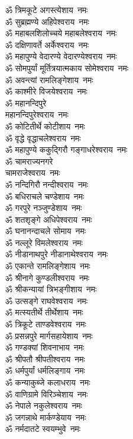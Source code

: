 \begin{multicols}{2}
\begin{flushleft}
ॐ त्रिमकूटे अगस्त्येशाय~नमः\\
ॐ सुब्रह्मण्ये अहिपेश्वराय~नमः\\
ॐ महाबलशिलोच्चये महाबलेश्वराय~नमः\\
ॐ दक्षिणावर्ते अर्केश्वराय~नमः\\
ॐ महापुण्ये वेदारण्ये वेदारण्येश्वराय~नमः\\
ॐ सोमपुर्यां मूर्तित्रयात्मकाय  सोमेश्वराय~नमः\\
ॐ अवन्त्यां रामलिङ्गेशाय~नमः\hfill{}\\
ॐ काश्मीरे विजयेश्वराय~नमः\\
ॐ महानन्दिपुरे\\ महानन्दिपुरेश्वराय~नमः\\
ॐ कोटितीर्थे कोटीशाय~नमः\\
ॐ वृद्धे वृद्धाचलेश्वराय~नमः\\
ॐ महापुण्ये ककुद्गिरौ गङ्गाधरेश्वराय~नमः\\
ॐ चामराज्यनगरे\\ चामराजेश्वराय~नमः\\
ॐ नन्दिगिरौ नन्दीश्वराय~नमः\\
ॐ बधिराचले चण्डेशाय~नमः\\
ॐ गरपुरे नञ्जुण्डेशाय~नमः\\
ॐ शतशृङ्गे अधिपेश्वराय~नमः\hfill{}\\
ॐ घनानन्दाचले सोमाय~नमः\\
ॐ नल्लूरे विमलेश्वराय~नमः\\
ॐ नीडानाथपुरे नीडानाथेश्वराय~नमः\\
ॐ एकान्ते रामलिङ्गेशाय~नमः\\
ॐ श्रीनागे कुण्डलीश्वराय~नमः\\
ॐ श्रीकन्यायां त्रिभङ्गीशाय~नमः\\
ॐ उत्सङ्गे राघवेश्वराय~नमः\\
ॐ मत्स्यतीर्थे तीर्थेशाय~नमः\\
ॐ त्रिकूटे ताण्डवेश्वराय~नमः\\
ॐ प्रसन्नपुरे मार्गसहायेशाय~नमः\hfill{}\\
ॐ गण्डक्यां शिवनाभाय~नमः\\
ॐ श्रीपतौ श्रीपतीश्वराय~नमः\\
ॐ धर्मपुर्यां धर्मलिङ्गाय~नमः\\
ॐ कन्याकुब्जे कलाधराय~नमः\\
ॐ वाणिग्रामे विरिञ्चेशाय~नमः\\
ॐ नेपाले नकुलेश्वराय~नमः\\
ॐ जगन्नाथे मार्कण्डेयाय~नमः\\
ॐ नर्मदातटे स्वयम्भुवे~नमः\\

\end{flushleft}
\end{multicols}
